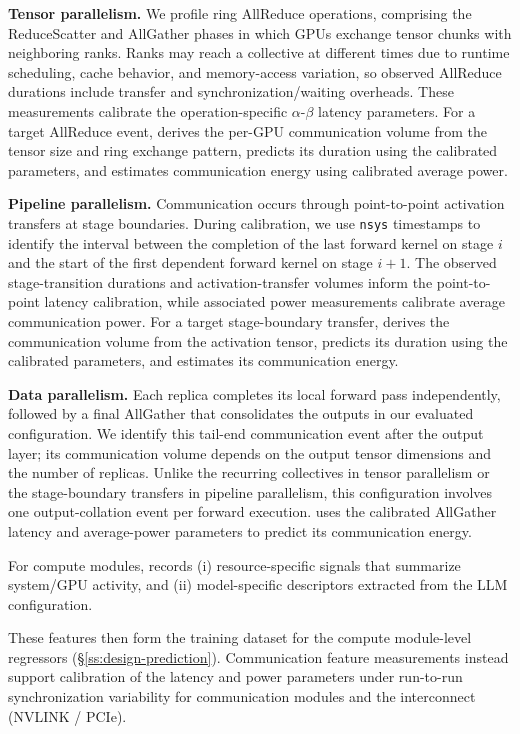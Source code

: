 \textbf{Tensor parallelism.} We profile ring AllReduce operations, comprising the ReduceScatter and AllGather phases in which GPUs exchange tensor chunks with neighboring ranks. Ranks may reach a collective at different times due to runtime scheduling, cache behavior, and memory-access variation, so observed AllReduce durations include transfer and synchronization/waiting overheads. These measurements calibrate the operation-specific $\alpha$-$\beta$ latency parameters. For a target AllReduce event, \sys{} derives the per-GPU communication volume from the tensor size and ring exchange pattern, predicts its duration using the calibrated parameters, and estimates communication energy using calibrated average power.

\textbf{Pipeline parallelism.} Communication occurs through point-to-point activation transfers at stage boundaries. During calibration, we use \texttt{nsys} timestamps to identify the interval between the completion of the last forward kernel on stage $i$ and the start of the first dependent forward kernel on stage $i+1$. The observed stage-transition durations and activation-transfer volumes inform the point-to-point latency calibration, while associated power measurements calibrate average communication power. For a target stage-boundary transfer, \sys{} derives the communication volume from the activation tensor, predicts its duration using the calibrated parameters, and estimates its communication energy.

\textbf{Data parallelism.} Each replica completes its local forward pass independently, followed by a final AllGather that consolidates the outputs in our evaluated configuration. We identify this tail-end communication event after the output layer; its communication volume depends on the output tensor dimensions and the number of replicas. Unlike the recurring collectives in tensor parallelism or the stage-boundary transfers in pipeline parallelism, this configuration involves one output-collation event per forward execution. \sys{} uses the calibrated AllGather latency and average-power parameters to predict its communication energy.

For compute modules, \sys{} records (i) resource-specific signals that summarize system/GPU activity, and (ii) model-specific descriptors extracted from the LLM configuration.

These features then form the training dataset for the compute module-level regressors (\S\ref{ss:design-prediction}). Communication feature measurements instead support calibration of the latency and power parameters under run-to-run synchronization variability for communication modules and the interconnect (NVLINK / PCIe).


